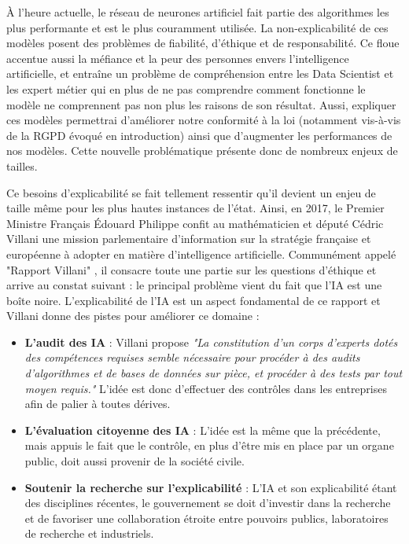 À l'heure actuelle, le réseau de neurones artificiel fait partie des algorithmes les plus performante et est le plus couramment utilisée.
La non-explicabilité de ces modèles posent des problèmes de fiabilité, d'éthique et de responsabilité. Ce floue accentue aussi la méfiance et la peur des personnes envers l'intelligence artificielle, et entraîne un problème de compréhension entre les Data Scientist et les expert métier qui en plus de ne pas comprendre comment fonctionne le modèle ne comprennent pas non plus les raisons de son résultat. Aussi, expliquer ces modèles permettrai d'améliorer notre conformité à la loi (notamment vis-à-vis de la RGPD évoqué en introduction) ainsi que d'augmenter les performances de nos modèles. Cette nouvelle problématique présente donc de nombreux enjeux de tailles.\par
Ce besoins d'explicabilité se fait tellement ressentir qu'il devient un enjeu de taille même pour les plus hautes instances de l'état. Ainsi, en 2017, le Premier Ministre Français Édouard Philippe confit au mathématicien et député Cédric Villani une mission parlementaire d’information sur la stratégie française et européenne à adopter en matière d'intelligence artificielle. Communément appelé "Rapport Villani" \cite{rapportVillani}, il consacre toute une partie sur les questions d'éthique et arrive au constat suivant : le principal problème vient du fait que l'IA est une boîte noire. L'explicabilité de l'IA est un aspect fondamental de ce rapport et Villani donne des pistes pour améliorer ce domaine :
\begin{itemize}
    \item \textbf{L’audit des IA} : Villani propose \textit{"La constitution d’un corps d’experts dotés des compétences requises semble nécessaire pour procéder à des audits d’algorithmes et de bases de données sur pièce, et procéder à des tests par tout moyen requis."} L'idée est donc d'effectuer des contrôles dans les entreprises afin de palier à toutes dérives.
    \item \textbf{L’évaluation citoyenne des IA} : L'idée est la même que la précédente, mais appuis le fait que le contrôle, en plus d'être mis en place par un organe public, doit aussi provenir de la société civile.
    \item \textbf{Soutenir la recherche sur l’explicabilité} : L'IA et son explicabilité étant des disciplines récentes, le gouvernement se doit d'investir dans la recherche et de favoriser une collaboration étroite entre pouvoirs publics, laboratoires de recherche et industriels.
\end{itemize}

